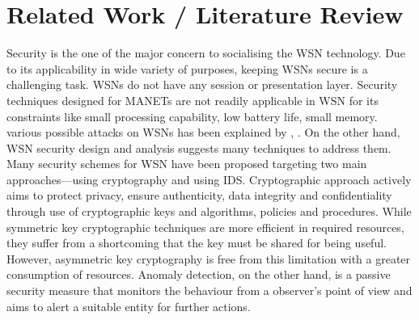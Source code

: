 \documentclass[conference,final]{IEEEtran}
\begin{document}
\section{Related Work / Literature Review} 
\label{sec:lit}
Security is the one of the major concern to socialising the WSN technology.
Due to its applicability in wide variety of purposes, keeping WSNs secure is a challenging task.
WSNs do not have any session or presentation layer.
Security techniques designed for MANETs are not readily applicable in WSN for its constraints like small processing capability, low battery life, small memory.
various possible attacks on WSNs has been explained by   \cite{roosta2006taxonomy}, \cite{roosta2008attacks}.
On the other hand, WSN security design and analysis suggests many techniques to address them.
Many security schemes for WSN have been proposed targeting two main approaches---using cryptography and using IDS. %
Cryptographic approach actively aims to protect privacy, ensure authenticity, data integrity and confidentiality through use of cryptographic keys and algorithms, policies and procedures.
While symmetric key cryptographic techniques are more efficient in required resources, they suffer from a shortcoming that the key must be shared for being useful. 
However, asymmetric key cryptography is free from this limitation with a greater consumption of resources.
Anomaly detection, on the other hand, is a passive security measure that monitors the behaviour from a observer's point of view and aims to alert a suitable entity for further actions.
\end{document}
